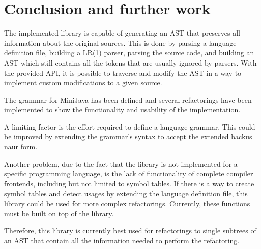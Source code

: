 \section{Conclusion and further work}

The implemented library is capable of generating an AST that preserves all information about the original sources.
This is done by parsing a language definition file, building a LR(1) parser, parsing the source code, and building an AST
which still contains all the tokens that are usually ignored by parsers.
With the provided API, it is possible to traverse and modify the AST in a way to implement custom modifications to a given source.

The grammar for MiniJava has been defined and several refactorings have been implemented to show the functionality and usability of the implementation.

A limiting factor is the effort required to define a language grammar. This could be improved by extending the grammar's
syntax to accept the extended backus naur form.

Another problem, due to the fact that the library is not implemented for a specific programming language, is the lack of 
functionality of complete compiler frontends, including but not limited to symbol tables. If there is a way to 
create symbol tables and detect usages by extending the language definition file, this library could be used for more complex refactorings.
Currently, these functions must be built on top of the library.

Therefore, this library is currently best used for refactorings to single subtrees of an AST that contain all the information needed to perform the refactoring.
